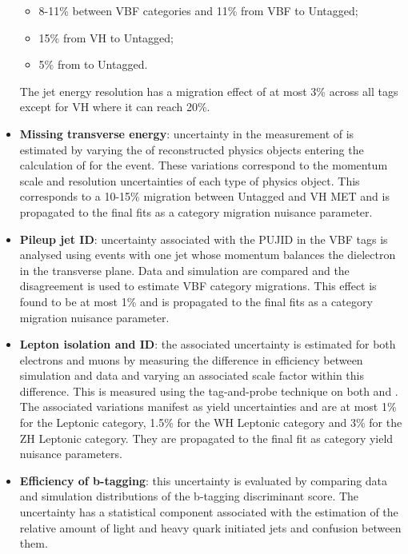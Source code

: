 \begin{itemize}[noitemsep]
{\begin{itemize}[noitemsep]
               \item[\textbullet] 8-11\% between VBF categories and 11\% from VBF to Untagged;
               \item[\textbullet] 15\% from VH to Untagged;
               \item[\textbullet] 5\% from \ttH to Untagged.
           \end{itemize}
           The jet energy resolution has a migration effect of at most 3\% across all tags except for VH where it can reach 20\%.
           }
    \item {\textbf{Missing transverse energy}: 
           uncertainty in the measurement of \MET is estimated by varying the \pt of reconstructed physics objects entering the calculation of \MET for the event. 
           These variations correspond to the momentum scale and resolution uncertainties of each type of physics object. 
           This corresponds to a 10-15\% migration between Untagged and VH MET and is propagated to the final fits as a category migration nuisance parameter.
           }
    \item {\textbf{Pileup jet ID}: 
           uncertainty associated with the PUJID in the VBF tags is analysed using \Zee events with one jet whose momentum balances the dielectron in the transverse plane.            
           Data and simulation are compared and the disagreement is used to estimate VBF category migrations. This effect is found to be at most 1\% and is propagated to the final fits as a category migration nuisance parameter. 
           }
    \item {\textbf{Lepton isolation and ID}: 
           the associated uncertainty is estimated for both electrons and muons by measuring the difference in efficiency between simulation and data and varying an associated scale factor within this difference. 
           This is measured using the tag-and-probe technique on both \Zee and \Zmumu.
           The associated variations manifest as yield uncertainties and are at most 1\% for the \ttH Leptonic category, 1.5\% for the WH Leptonic category and 3\% for the ZH Leptonic category. They are propagated to the final fit as category yield nuisance parameters. 
           }
    \item {\textbf{Efficiency of b-tagging}: 
           this uncertainty is evaluated by comparing data and simulation distributions of the b-tagging discriminant score. The uncertainty has a statistical component associated with the estimation of the relative amount of light and heavy quark initiated jets and confusion between them. 
}
\end{itemize}
